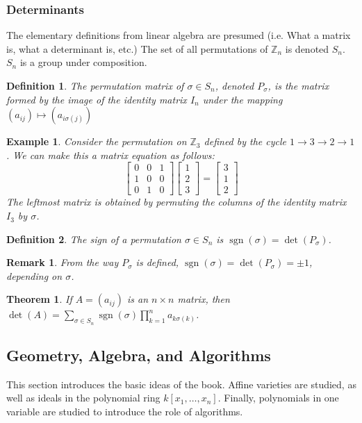 \documentclass{article}
\theoremstyle{mystyle}
\newtheorem{theorem}{Theorem}[section]
\newtheorem{definition}{Definition}[section]
\newtheorem{example}{Example}[section]
\newtheorem{remark}{Remark}[section]
\DeclareMathOperator{\sgn}{sgn}
\begin{document}
\subsubsection{Determinants}
The elementary definitions from linear algebra are presumed (i.e. What a matrix is, what a determinant is, etc.) The set of all permutations of $\mathbb{Z}_{n}$ is denoted $S_n$. $S_{n}$ is a group under composition.
\begin{definition}
The permutation matrix of $\sigma \in S_{n}$, denoted $P_{\sigma}$, is the matrix formed by the image of the identity matrix $I_{n}$ under the mapping $(a_{ij})\mapsto (a_{i\sigma(j)})$
\end{definition}
\begin{example}
Consider the permutation on $\mathbb{Z}_3$ defined by the cycle $1\rightarrow 3 \rightarrow 2 \rightarrow 1$. We can make this a matrix equation as follows:
\begin{equation*}
    \begin{bmatrix} 0 & 0 & 1 \\ 1 & 0 & 0 \\ 0 & 1 & 0 \end{bmatrix} \begin{bmatrix} 1 \\ 2 \\ 3 \end{bmatrix} = \begin{bmatrix} 3 \\ 1 \\ 2 \end{bmatrix}    
\end{equation*}
The leftmost matrix is obtained by permuting the columns of the identity matrix $I_{3}$ by $\sigma$.
\end{example}
\begin{definition}
The sign of a permutation $\sigma\in S_{n}$ is $\sgn(\sigma) = \det(P_{\sigma})$.
\end{definition}
\begin{remark}
From the way $P_{\sigma}$ is defined, $\sgn(\sigma) = \det(P_{\sigma}) = \pm 1$, depending on $\sigma$.
\end{remark}
\begin{theorem}
If $A=(a_{ij})$ is an $n\times n$ matrix, then $\det(A) = \underset{\sigma \in S_n}\sum \sgn(\sigma) \prod_{k=1}^{n} a_{k\sigma(k)}$.
\end{theorem}
\subsection{Geometry, Algebra, and Algorithms}
This section introduces the basic ideas of the book. Affine varieties are studied, as well as ideals in the polynomial ring $k[x_1,\hdots ,x_n]$. Finally, polynomials in one variable are studied to introduce the role of algorithms.
\end{document}

